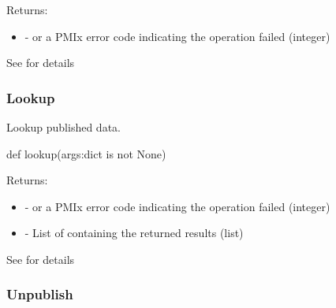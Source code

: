 Returns:
\begin{itemize}
    \item {} -  or a \ac{PMIx} error code indicating the operation failed (integer)
\end{itemize}

See  for details


\subsubsection{Lookup}

\summary

Lookup published data.

\format

\pyspecificstart
\begin{codepar}
def lookup(args:dict is not None)
\end{codepar}
\pyspecificend

\begin{arglist}
\end{arglist}

Returns:
\begin{itemize}
    \item {} -  or a \ac{PMIx} error code indicating the operation failed (integer)
    \item {} - List of  containing the returned results (list)
\end{itemize}

See  for details


\subsubsection{Unpublish}

\summary

